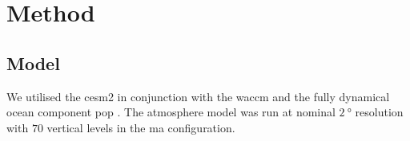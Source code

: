 \documentclass{ametsocV6.1}
\begin{document}
\section{Method}\label{sec:method}

\subsection{Model}

%

We utilised the \gls{cesm2} \citep{danabasoglu2020} in conjunction with the \gls{waccm}
\citep{gettleman2019} and the fully dynamical ocean component \gls{pop}
\citep{smith2010, danabasoglu2020}. The atmosphere model was run at nominal
\(\SI{2}{\degree}\) resolution with \(70\) vertical levels in the \gls{ma}
configuration.
\end{document}
